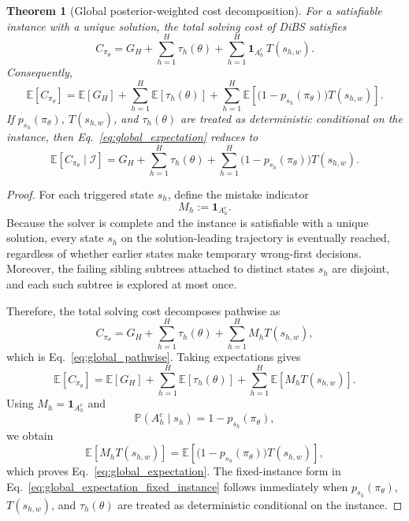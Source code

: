 \documentclass[lettersize,journal]{IEEEtran}
\newtheorem{theorem}{Theorem}
\begin{document}
\begin{theorem}[Global posterior-weighted cost decomposition]
	\label{thm:global_cost}
	For a satisfiable instance with a unique solution, the total solving
	cost of DiBS satisfies
	\begin{equation}
		C_{\pi_\theta}
		=
		G_H
		+
		\sum_{h=1}^{H} \tau_h(\theta)
		+
		\sum_{h=1}^{H}
		\mathbf{1}_{A_h^c}\, T(s_{h,w}).
		\label{eq:global_pathwise}
	\end{equation}
	Consequently,
	\begin{equation}
		\mathbb{E}[C_{\pi_\theta}]
		=
		\mathbb{E}[G_H]
		+
		\sum_{h=1}^{H} \mathbb{E}[\tau_h(\theta)]
		+
		\sum_{h=1}^{H}
		\mathbb{E}\!\left[
		\bigl(1-p_{s_h}(\pi_\theta)\bigr) T(s_{h,w})
		\right].
		\label{eq:global_expectation}
	\end{equation}
	If \(p_{s_h}(\pi_\theta)\), \(T(s_{h,w})\), and \(\tau_h(\theta)\)
	are treated as deterministic conditional on the instance, then
	Eq.~\eqref{eq:global_expectation} reduces to
	\begin{equation}
		\mathbb{E}[C_{\pi_\theta}\mid \mathcal{I}]
		=
		G_H
		+
		\sum_{h=1}^{H} \tau_h(\theta)
		+
		\sum_{h=1}^{H}
		\bigl(1-p_{s_h}(\pi_\theta)\bigr)T(s_{h,w}).
		\label{eq:global_expectation_fixed_instance}
	\end{equation}
\end{theorem}

\begin{proof}
	For each triggered state \(s_h\), define the mistake indicator
	\[
	M_h := \mathbf{1}_{A_h^c}.
	\]
	Because the solver is complete and the instance is satisfiable with
	a unique solution, every state \(s_h\) on the solution-leading
	trajectory is eventually reached, regardless of whether earlier states
	make temporary wrong-first decisions. Moreover, the failing sibling
	subtrees attached to distinct states \(s_h\) are disjoint, and each
	such subtree is explored at most once.

	Therefore, the total solving cost decomposes pathwise as
	\[
	C_{\pi_\theta}
	=
	G_H
	+
	\sum_{h=1}^{H} \tau_h(\theta)
	+
	\sum_{h=1}^{H} M_h T(s_{h,w}),
	\]
	which is Eq.~\eqref{eq:global_pathwise}. Taking expectations gives
	\[
	\mathbb{E}[C_{\pi_\theta}]
	=
	\mathbb{E}[G_H]
	+
	\sum_{h=1}^{H}\mathbb{E}[\tau_h(\theta)]
	+
	\sum_{h=1}^{H}\mathbb{E}[M_h T(s_{h,w})].
	\]
	Using \(M_h=\mathbf{1}_{A_h^c}\) and
	\[
	\mathbb{P}(A_h^c\mid s_h)
	=
	1-p_{s_h}(\pi_\theta),
	\]
	we obtain
	\[
	\mathbb{E}[M_h T(s_{h,w})]
	=
	\mathbb{E}\!\left[
	\bigl(1-p_{s_h}(\pi_\theta)\bigr)T(s_{h,w})
	\right],
	\]
	which proves Eq.~\eqref{eq:global_expectation}. The fixed-instance
	form in Eq.~\eqref{eq:global_expectation_fixed_instance} follows
	immediately when \(p_{s_h}(\pi_\theta)\), \(T(s_{h,w})\), and
	\(\tau_h(\theta)\) are treated as deterministic conditional on the
	instance.
\end{proof}
\end{document}
